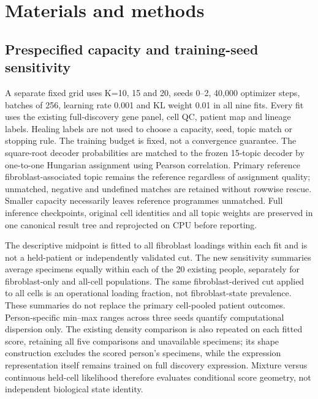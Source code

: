 \section{Materials and methods}
\subsection{Prespecified capacity and training-seed sensitivity}
A separate fixed grid uses K=10, 15 and 20, seeds 0--2, 40,000 optimizer steps, batches of 256, learning rate 0.001 and KL weight 0.01 in all nine fits. Every fit uses the existing full-discovery gene panel, cell QC, patient map and lineage labels. Healing labels are not used to choose a capacity, seed, topic match or stopping rule. The training budget is fixed, not a convergence guarantee. The square-root decoder probabilities are matched to the frozen 15-topic decoder by one-to-one Hungarian assignment using Pearson correlation. Primary reference fibroblast-associated topic remains the reference regardless of assignment quality; unmatched, negative and undefined matches are retained without rowwise rescue. Smaller capacity necessarily leaves reference programmes unmatched. Full inference checkpoints, original cell identities and all topic weights are preserved in one canonical result tree and reprojected on CPU before reporting.

The descriptive midpoint is fitted to all fibroblast loadings within each fit and is not a held-patient or independently validated cut. The new sensitivity summaries average specimens equally within each of the 20 existing people, separately for fibroblast-only and all-cell populations. The same fibroblast-derived cut applied to all cells is an operational loading fraction, not fibroblast-state prevalence. These summaries do not replace the primary cell-pooled patient outcomes. Person-specific min--max ranges across three seeds quantify computational dispersion only. The existing density comparison is also repeated on each fitted score, retaining all five comparisons and unavailable specimens; its shape construction excludes the scored person's specimens, while the expression representation itself remains trained on full discovery expression. Mixture versus continuous held-cell likelihood therefore evaluates conditional score geometry, not independent biological state identity.

